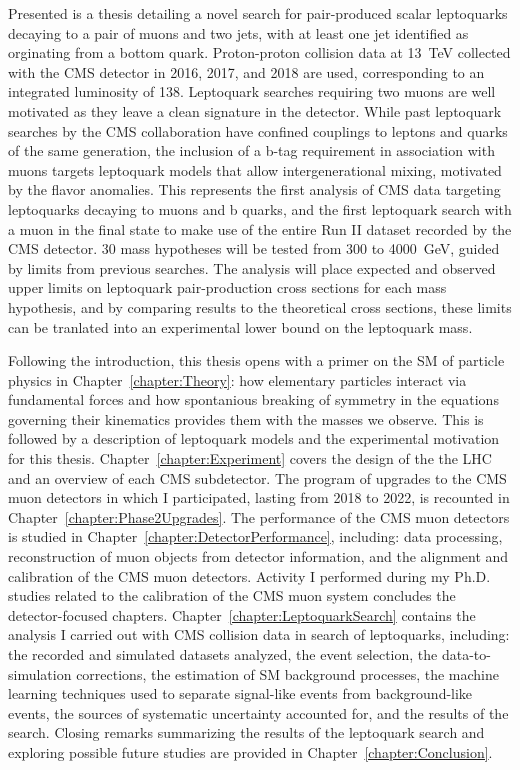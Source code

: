 Presented is a thesis detailing a novel search for pair-produced scalar leptoquarks decaying to a pair of muons and two jets, with at least one jet identified as orginating from a bottom quark. Proton-proton collision data at \SI{13}{\TeV} collected with the CMS detector in 2016, 2017, and 2018 are used, corresponding to an integrated luminosity of \SI{138}{\invfb}. Leptoquark searches requiring two muons are well motivated as they leave a clean signature in the detector. While past leptoquark searches by the CMS collaboration have confined couplings to leptons and quarks of the same generation, the inclusion of a b-tag requirement in association with muons targets leptoquark models that allow intergenerational mixing, motivated by the flavor anomalies. This represents the first analysis of CMS data targeting leptoquarks decaying to muons and b quarks, and the first leptoquark search with a muon in the final state to make use of the entire Run II dataset recorded by the CMS detector. 30 mass hypotheses will be tested from 300 to \SI{4000}{\GeV}, guided by limits from previous searches. The analysis will place expected and observed upper limits on leptoquark pair-production cross sections for each mass hypothesis, and by comparing results to the theoretical cross sections, these limits can be tranlated into an experimental lower bound on the leptoquark mass.


Following the introduction, this thesis opens with a primer on the SM of particle physics in Chapter~\ref{chapter:Theory}: how elementary particles interact via fundamental forces and how spontanious breaking of symmetry in the equations governing their kinematics provides them with the masses we observe. This is followed by a description of leptoquark models and the experimental motivation for this thesis. Chapter~\ref{chapter:Experiment} covers the design of the the LHC and an overview of each CMS subdetector. The program of upgrades to the CMS muon detectors in which I participated, lasting from 2018 to 2022, is recounted in Chapter~\ref{chapter:Phase2Upgrades}. The performance of the CMS muon detectors is studied in Chapter~\ref{chapter:DetectorPerformance}, including: data processing, reconstruction of muon objects from detector information, and the alignment and calibration of the CMS muon detectors. Activity I performed during my Ph.D. studies related to the calibration of the CMS muon system concludes the detector-focused chapters. Chapter~\ref{chapter:LeptoquarkSearch} contains the analysis I carried out with CMS collision data in search of leptoquarks, including: the recorded and simulated datasets analyzed, the event selection, the data-to-simulation corrections, the estimation of SM background processes, the machine learning techniques used to separate signal-like events from background-like events, the sources of systematic uncertainty accounted for, and the results of the search. Closing remarks summarizing the results of the leptoquark search and exploring possible future studies are provided in Chapter~\ref{chapter:Conclusion}.  